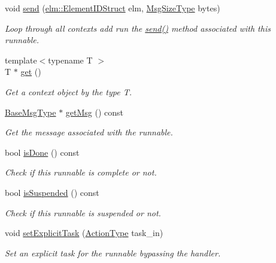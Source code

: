 \begin{DoxyCompactItemize}
void \hyperlink{structvt_1_1runnable_1_1_runnable_new_aa7e06ec59e7376d1d01dfa6ab9a9563b}{send} (\hyperlink{structvt_1_1elm_1_1_element_i_d_struct}{elm\+::\+Element\+I\+D\+Struct} elm, \hyperlink{namespacevt_a408e86a8c7c89309b52907dc5a513924}{Msg\+Size\+Type} bytes)
\begin{DoxyCompactList}\small\item\em Loop through all contexts add run the {\ttfamily \hyperlink{structvt_1_1runnable_1_1_runnable_new_aa7e06ec59e7376d1d01dfa6ab9a9563b}{send()}} method associated with this runnable. \end{DoxyCompactList}\item 
{\footnotesize template$<$typename T $>$ }\\T $\ast$ \hyperlink{structvt_1_1runnable_1_1_runnable_new_ab7cbde782a5ad0c67fa4c63f02e174ad}{get} ()
\begin{DoxyCompactList}\small\item\em Get a context object by the type {\ttfamily T}. \end{DoxyCompactList}\item 
\hyperlink{namespacevt_a44d0d4e144748f2b19a1cfd962f50338}{Base\+Msg\+Type} $\ast$ \hyperlink{structvt_1_1runnable_1_1_runnable_new_aed655dff826a821a3db9162259f33288}{get\+Msg} () const
\begin{DoxyCompactList}\small\item\em Get the message associated with the runnable. \end{DoxyCompactList}\item 
bool \hyperlink{structvt_1_1runnable_1_1_runnable_new_ad9acf28ef0fed7a7d63a9ca1d3ba3efc}{is\+Done} () const
\begin{DoxyCompactList}\small\item\em Check if this runnable is complete or not. \end{DoxyCompactList}\item 
bool \hyperlink{structvt_1_1runnable_1_1_runnable_new_af45b4443eee6dff57249bda0a9c2b7f0}{is\+Suspended} () const
\begin{DoxyCompactList}\small\item\em Check if this runnable is suspended or not. \end{DoxyCompactList}\item 
void \hyperlink{structvt_1_1runnable_1_1_runnable_new_aa30544adc03798c988a5e3bea2bfa3f3}{set\+Explicit\+Task} (\hyperlink{namespacevt_ae0a5a7b18cc99d7b732cb4d44f46b0f3}{Action\+Type} task\+\_\+in)
\begin{DoxyCompactList}\small\item\em Set an explicit task for the runnable bypassing the handler. \end{DoxyCompactList}\end{DoxyCompactItemize}
